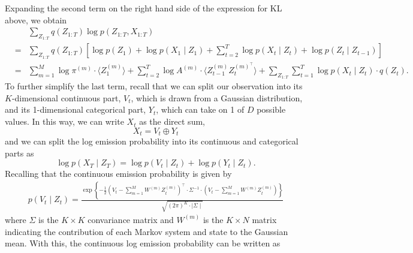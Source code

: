 \documentclass{amsart}
\begin{document}
Expanding the second term on the right hand side of the expression 
for KL above, we obtain 
\begin{eqnarray*}
&&\sum_{Z_{1:T}}q(Z_{1:T})\log p(Z_{1:T},X_{1:T}) 
\\
& = & \sum_{Z_{1:T}}q(Z_{1:T})\left[\log p(Z_1) + \log p(X_1\mid Z_1) + 
\sum_{t=2}^T\log p(X_t\mid Z_t)+ \log p(Z_t\mid Z_{t-1})\right]
\\
& = & \sum_{m=1}^M \log 
\pi^{(m)}\cdot \langle Z_1^{(m)}\rangle 
+\sum_{t=2}^T\log A^{(m)}\cdot \langle 
Z_{t-1}^{(m)}Z_t^{(m)^\intercal}\rangle +
\sum_{Z_{1:T}}\sum_{t=1}^T\log p(X_t\mid Z_t)\cdot q(Z_t).
\end{eqnarray*}
To further simplify the last term, recall that we can split our 
observation into its $K$-dimensional continuous part, $V_t$, which is 
drawn from a Gaussian distribution, and its 
1-dimensional categorical part, $Y_t$, which can take on 1 of $D$ 
possible values. In this way, we can write $X_t$ as the direct sum, 
\[
X_t = V_t\oplus Y_t
\]
and we can split the log emission probability into its continuous and 
categorical parts as 
\[
\log p(X_T\mid Z_T) = \log p(V_t\mid Z_t) + \log p(Y_t\mid Z_t).
\]
Recalling that the continuous emission probability is given by 
\begin{eqnarray*}
p(V_t\mid Z_t) = \frac{\exp\left\{-\frac{1}{2}\left(V_t - 
\sum_{m=1}^MW^{(m)}Z_t^{(m)}\right)^\intercal\cdot \Sigma^{-1}\cdot \left(V_t - 
\sum_{m=1}^MW^{(m)}Z_t^{(m)}\right)\right\}}{\sqrt{(2\pi)^{K}\cdot 
\mid \Sigma\mid}}
\end{eqnarray*}
where $\Sigma$ is the $K\times K$ convariance matrix and $W^{(m)}$ is 
the $K\times N$ matrix indicating the contribution of each Markov 
system and state to the Gaussian mean. 
With this, the continuous log emission probability can be written as 
\end{document}

